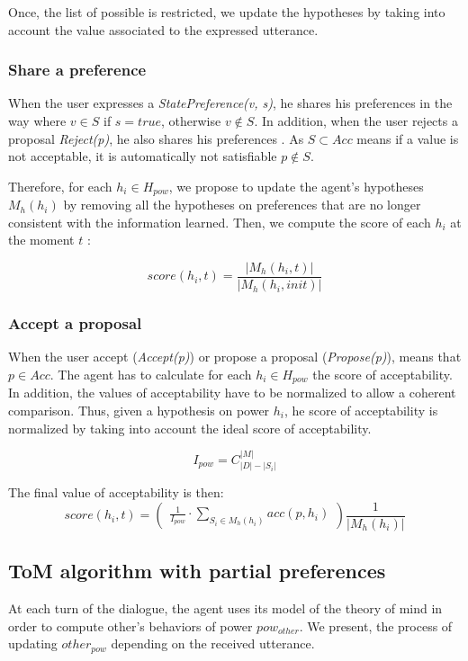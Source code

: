 \documentclass[sigconf]{aamas}  %
\begin{document}
	Once, the list of possible is restricted, we update the hypotheses by taking into account the value associated to the expressed utterance.
	
	\subsubsection{Share a preference}
	When the user expresses a \emph{StatePreference(v, s)}, he shares his preferences in the way where $v \in S$ if $s =true$, otherwise $v \notin S$. 
	In addition, when the user rejects a proposal \emph{Reject(p)}, he also shares his preferences . As $S \subset Acc$ means if a value is not acceptable, it is automatically not satisfiable $p \notin S$. 
	
	Therefore, for each  $h_i \in H_{pow}$, we propose to update the agent's hypotheses $M_h(h_i)$ by removing all the hypotheses on preferences that are no longer consistent with the information learned. 
	Then, we compute the score of each $h_i$ at the moment $t$ :
	
	$$score(h_i,t) = \frac{|M_h(h_i, t)|}{|M_h(h_i, init)|}$$

		
	\subsubsection{Accept a proposal}
	When the user accept (\emph{Accept(p)}) or propose a proposal (\emph{Propose(p)}), means that $p \in Acc$. 
	The agent has to calculate for each $h_i \in H_{pow}$ the score of acceptability. In addition, the values of acceptability have to be normalized to allow a coherent comparison. Thus, given a hypothesis on power $h_i$, he score of acceptability is normalized by taking into account the ideal score of acceptability.
	
	$$I_{pow} =  C_{|D|-|S_i|}^{|M|}$$
	
	
	The final value of acceptability is then:
	\begin{equation}
	score(h_i, t)= \left( \begin{array}{c}  \frac{1}{I_{pow}} \cdot \sum_{S_i \in M_h(h_i) } acc(p, h_i) 
	\end{array}\right) \frac{1}{| M_h(h_i)|}
	\end{equation}

	\subsection{ToM algorithm with partial preferences}
	At each turn of the dialogue, the agent uses its model of the theory of mind in order to compute other's behaviors of power $pow_{other}$. We present, the process of updating $other_{pow}$ depending on the received utterance. 
		
\end{document}
